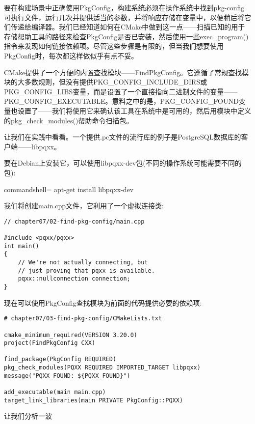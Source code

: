 要在构建场景中正确使用PkgConfig，构建系统必须在操作系统中找到pkg-config可执行文件，运行几次并提供适当的参数，并将响应存储在变量中，以便稍后将它们传递给编译器。我们已经知道如何在CMake中做到这一点——扫描已知的用于存储帮助工具的路径来检查PkgConfig是否已安装，然后使用一些exec\_program()指令来发现如何链接依赖项。尽管这些步骤是有限的，但当我们想要使用PkgConfig时，每次都这样做似乎有点不妥。

CMake提供了一个方便的内置查找模块——FindPkgConfig。它遵循了常规查找模块的大多数规则，但没有提供PKG\_CONFIG\_INCLUDE\_DIRS或PKG\_CONFIG\_LIBS变量，而是设置了一个直接指向二进制文件的变量——PKG\_CONFIG\_EXECUTABLE。意料之中的是，PKG\_CONFIG\_FOUND变量也设置了——我们将使用它来确认该工具在系统中是可用的，然后用模块中定义的pkg\_check\_modules()帮助命令扫描包。

让我们在实践中看看。一个提供.pc文件的流行库的例子是PostgreSQL数据库的客户端——libpqxx。

要在Debian上安装它，可以使用libpqxx-dev包(不同的操作系统可能需要不同的包):

\begin{tcblisting}{commandshell={}}
apt-get install libpqxx-dev
\end{tcblisting}

我们将创建main.cpp文件，它利用了一个虚拟连接类:

\begin{lstlisting}[style=styleCXX]
// chapter07/02-find-pkg-config/main.cpp

#include <pqxx/pqxx>
int main()
{
	// We're not actually connecting, but
	// just proving that pqxx is available.
	pqxx::nullconnection connection;
}
\end{lstlisting} 

现在可以使用PkgConfig查找模块为前面的代码提供必要的依赖项:

\begin{lstlisting}[style=styleCMake]
# chapter07/03-find-pkg-config/CMakeLists.txt

cmake_minimum_required(VERSION 3.20.0)
project(FindPkgConfig CXX)

find_package(PkgConfig REQUIRED)
pkg_check_modules(PQXX REQUIRED IMPORTED_TARGET libpqxx)
message("PQXX_FOUND: ${PQXX_FOUND}")

add_executable(main main.cpp)
target_link_libraries(main PRIVATE PkgConfig::PQXX)
\end{lstlisting}

让我们分析一波

